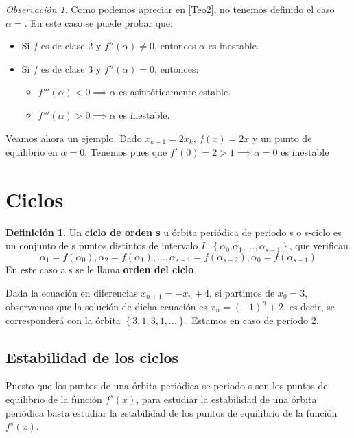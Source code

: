 \documentclass[a4paper, 12pt]{article}
\theoremstyle{plain}
\theoremstyle{definition}
\newtheorem{definicion}[teorema]{Definición}
\theoremstyle{remark}
\newtheorem*{observacion}{Observación}
\begin{document}
	\begin{observacion}
		Como podemos apreciar en \ref{Teo2}, no tenemos definido el caso $\alpha=$. En este caso se puede probar que:
		\begin{itemize}
			\item Si $f$ es de clase 2 y $f''(\alpha)\not= 0$, entonces $\alpha$ es inestable.
			\item Si $f$ es de clase 3 y $f''(\alpha)=0$, entonces:
			\begin{itemize}
				\item $f'''(\alpha)<0 \implies \alpha$ es asintóticamente estable.
				\item $f'''(\alpha)>0 \implies \alpha$ es inestable.
			\end{itemize}
		\end{itemize}
	\end{observacion}

	\textcolor{Azul}{Veamos ahora un ejemplo. Dado $x_{k+1} = 2x_k$, $f(x)=2x$ y un punto de equilibrio en $\alpha=0$. Tenemos pues que $f'(0)=2>1 \implies \alpha=0$ es inestable}

	\section{Ciclos}
	\begin{definicion}\label{Ciclo}
		Un \textbf{ciclo de orden s} u órbita periódica de periodo s o s-ciclo es un conjunto de s puntos distintos de intervalo $I$, $\left\{\alpha_0.\alpha_1,...,\alpha_{s-1}\right\}$, que verifican
		\[\alpha_1=f(\alpha_0), \alpha_2=f(\alpha_1),...,\alpha_{s-1}=f(\alpha_{s-2}),\alpha_0=f(\alpha_{s-1})\]
		En este caso a s se le llama \textbf{orden del ciclo}
	\end{definicion}
	
	\smallskip
	\textcolor{Azul}{Dada la ecuación en diferencias $x_{n+1}=-x_n+4$, si partimos de $x_0=3$, observamos que la solución de dicha ecuación es $x_n=(-1)^n+2$, es decir, se corresponderá con la órbita \(\left\{3,1,3,1,...\right\}\). Estamos en caso de periodo 2.}
	
	\subsection{Estabilidad de los ciclos}
	Puesto que los puntos de una órbita periódica se periodo s son los puntos de equilibrio de la función $f^s(x)$, para estudiar la estabilidad de una órbita periódica basta estudiar la estabilidad de los puntos de equilibrio de la función $f^s(x)$.
	
\end{document}
